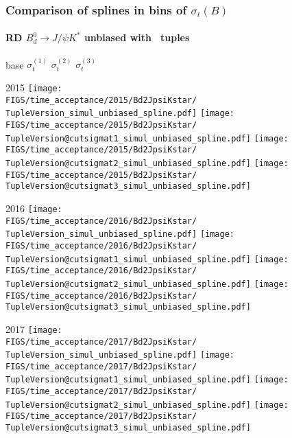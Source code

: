 \begin{frame} %
\frametitle{Comparison of splines in bins of $\sigma_t(B)$}
\framesubtitle{RD $B_d^0\rightarrow J/\psi K^*$ unbiased with \TupleVersion\, tuples}

  \phantom{2020} base \hspace*{1.5cm} $\sigma_t^{(1)}$ \hspace*{1.5cm} $\sigma_t^{(2)}$ \hspace*{1.5cm} $\sigma_t^{(3)}$

  2015
  \texttt{[image: \\FIGS/time\_acceptance/2015/Bd2JpsiKstar/\\TupleVersion\_simul\_unbiased\_spline.pdf]}
  \texttt{[image: \\FIGS/time\_acceptance/2015/Bd2JpsiKstar/\\TupleVersion@cutsigmat1\_simul\_unbiased\_spline.pdf]}
  \texttt{[image: \\FIGS/time\_acceptance/2015/Bd2JpsiKstar/\\TupleVersion@cutsigmat2\_simul\_unbiased\_spline.pdf]}
  \texttt{[image: \\FIGS/time\_acceptance/2015/Bd2JpsiKstar/\\TupleVersion@cutsigmat3\_simul\_unbiased\_spline.pdf]}
  \vspace*{2mm}

  2016
  \texttt{[image: \\FIGS/time\_acceptance/2016/Bd2JpsiKstar/\\TupleVersion\_simul\_unbiased\_spline.pdf]}
  \texttt{[image: \\FIGS/time\_acceptance/2016/Bd2JpsiKstar/\\TupleVersion@cutsigmat1\_simul\_unbiased\_spline.pdf]}
  \texttt{[image: \\FIGS/time\_acceptance/2016/Bd2JpsiKstar/\\TupleVersion@cutsigmat2\_simul\_unbiased\_spline.pdf]}
  \texttt{[image: \\FIGS/time\_acceptance/2016/Bd2JpsiKstar/\\TupleVersion@cutsigmat3\_simul\_unbiased\_spline.pdf]}
  \vspace*{2mm}

  2017
  \texttt{[image: \\FIGS/time\_acceptance/2017/Bd2JpsiKstar/\\TupleVersion\_simul\_unbiased\_spline.pdf]}
  \texttt{[image: \\FIGS/time\_acceptance/2017/Bd2JpsiKstar/\\TupleVersion@cutsigmat1\_simul\_unbiased\_spline.pdf]}
  \texttt{[image: \\FIGS/time\_acceptance/2017/Bd2JpsiKstar/\\TupleVersion@cutsigmat2\_simul\_unbiased\_spline.pdf]}
  \texttt{[image: \\FIGS/time\_acceptance/2017/Bd2JpsiKstar/\\TupleVersion@cutsigmat3\_simul\_unbiased\_spline.pdf]}
  \vspace*{2mm}


\end{frame}

